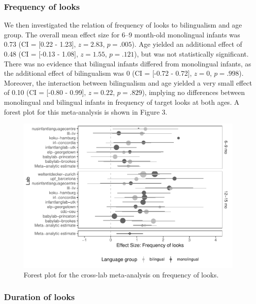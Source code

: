 \documentclass[,man,floatsintext]{apa6}
\begin{document}
\hypertarget{frequency-of-looks-1}{%
\subsubsection{Frequency of looks}\label{frequency-of-looks-1}}

We then investigated the relation of frequency of looks to bilingualism and age group. The overall mean effect size for 6--9 month-old monolingual infants was 0.73 (CI = {[}0.22 - 1.23{]}, \(z = 2.83\), \(p = .005\)). Age yielded an additional effect of 0.48 (CI = {[}-0.13 - 1.08{]}, \(z = 1.55\), \(p = .121\)), but was not statistically significant. There was no evidence that bilingual infants differed from monolingual infants, as the additional effect of bilingualism was 0 (CI = {[}-0.72 - 0.72{]}, \(z = 0\), \(p = .998\)). Moreover, the interaction between bilingualism and age yielded a very small effect of 0.10 (CI = {[}-0.80 - 0.99{]}, \(z = 0.22\), \(p = .829\)), implying no differences between monolingual and bilingual infants in frequency of target looks at both ages. A forest plot for this meta-analysis is shown in Figure 3.

\begin{figure}
\centering
\includegraphics{gaze-following-paper_files/figure-latex/fig3-1.pdf}
\caption{\label{fig:fig3}Forest plot for the cross-lab meta-analysis on frequency of looks.}
\end{figure}

\hypertarget{duration-of-looks-1}{%
\subsubsection{Duration of looks}\label{duration-of-looks-1}}
\end{document}
